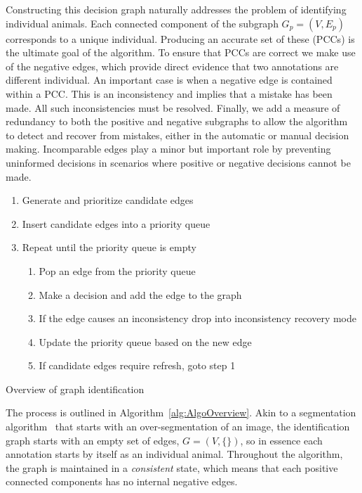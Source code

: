 Constructing this decision graph naturally addresses the problem of
  identifying individual animals.
Each connected component of the subgraph $G_p = (V, E_p)$ corresponds to a
  unique individual.
Producing an accurate set of these 
  (PCCs) is the ultimate goal of the algorithm.
To ensure that PCCs are correct we make use of the negative edges, which
  provide direct evidence that two annotations are different individual.
An important case is when a negative edge is contained within a PCC.
This is an inconsistency and implies that a mistake has been made.
All such inconsistencies must be resolved.
Finally, we add a measure of redundancy to both the positive and negative
  subgraphs to allow the algorithm to detect and recover from mistakes, either
  in the automatic or manual decision making.
Incomparable edges play a minor but important role by preventing uninformed
  decisions in scenarios where positive or negative decisions cannot be made.


\begin{algorithm}
    \begin{enumerate}
    \item Generate and prioritize candidate edges 
    \item Insert candidate edges into a priority queue 
    \item Repeat until the priority queue is empty
    \begin{enumerate}
        \item Pop an edge from the priority queue
        \item Make a decision and add the edge to the graph
        \item If the edge causes an inconsistency drop into inconsistency recovery mode
        \item Update the priority queue based on the new edge
        \item If candidate edges require refresh, goto step 1
    \end{enumerate}
    \end{enumerate}
\caption[Algorithm Overview]{Overview of graph identification}
\label{alg:AlgoOverview}
\end{algorithm}


The process is outlined in Algorithm~\ref{alg:AlgoOverview}.
Akin to a segmentation algorithm~\cite{fulkerson_class_2009} that starts with
  an over-segmentation of an image, the identification graph starts with an
  empty set of edges, %
$G = (V, \{ \})$, so in essence each annotation starts by itself as an
  individual animal.
Throughout the algorithm, the graph is maintained in a \emph{consistent}
  state, which means that each positive connected components has no internal
  negative edges.
 
